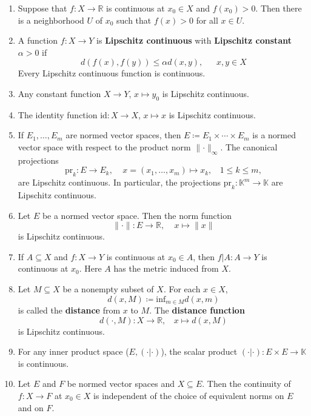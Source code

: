 \begin{eg}
\begin{enumerate}[label=(\alph*)]
        \item Suppose that \(f \colon X \to \mathbb{R}\) is continuous at \(x_0 \in X\)
        and \(f\left(x_0\right) > 0\). Then there is a neighborhood \(U\) of \(x_0\) such 
        that \(f\left(x\right) > 0\) for all \(x \in U\). 
        \item A function \(f \colon X \to Y\) is \textbf{Lipschitz continuous} with 
        \textbf{Lipschitz constant } \(\alpha > 0\) if 
        \[
           d(f(x), f(y)) \leq \alpha d(x, y), \:\:\:\:\:\:\: x,y \in X
        \]  
        Every Lipschitz continuous function is continuous. 
        \item Any constant function \(X \to Y\), \(x \mapsto y_0\) is Lipschitz continuous. 
        \item The identity function \(\text{id} \colon X \to X\), \(x \mapsto x\) 
        is Lipschitz continuous.
        \item If \(E_1, \ldots, E_m\) are normed vector spaces, then 
        \(E \coloneqq E_1 \times \cdots \times E_m\) is a normed vector space with 
        respect to the product norm \(\lVert \cdot \rVert_\infty\). The canonical projections
        \[
           \text{pr}_k \colon E \to E_k, \:\:\:\:\: x = (x_1,\ldots,x_m) \mapsto x_k, 
           \:\:\:\: 1 \leq k \leq m, 
        \]
        are Lipschitz continuous. In particular, the projections \(\text{pr}_k \colon 
        \mathbb{K}^m \to \mathbb{K}\) are Lipschitz continuous. 
        \item Let \(E\) be a normed vector space. Then the norm function
        \[
           \lVert \cdot \rVert \colon E \to \mathbb{R}, \:\:\:\:\: x \mapsto \lVert x \rVert
        \]
        is Lipschitz continuous. 
        \item If \(A \subseteq X\) and \(f \colon X \to Y\) is continuous at \(x_0 \in A\),
        then \(f|A \colon A \to Y\) is continuous at \(x_0\). Here \(A\) has the metric 
        induced from \(X\). 
        \item Let \(M \subseteq X\) be a nonempty subset of \(X\). For each \(x \in X\), 
        \[
           d(x, M) \coloneqq \text{inf}_{m \in M} d(x,m)
        \]
        is called the \textbf{distance} from \(x\) to \(M\). The \textbf{distance function}
        \[
            d(\cdot, M) \colon X \to \mathbb{R}, \:\:\:\: x \mapsto d(x, M)   
        \]
        is Lipschitz continuous. 
        \item For any inner product space (\(E, \left(\cdot|\cdot\right)\)), the scalar
        product \(\left(\cdot|\cdot\right) \colon E \times E \to \mathbb{K}\) is continuous. 
        \item Let \(E\) and \(F\) be normed vector spaces and \(X \subseteq E\). Then the 
        continuity of \(f \colon X \to F\) at \(x_0 \in X\) is independent of the choice of 
        equivalent norms on \(E\) and on \(F\).  


\end{enumerate}
\end{eg}
